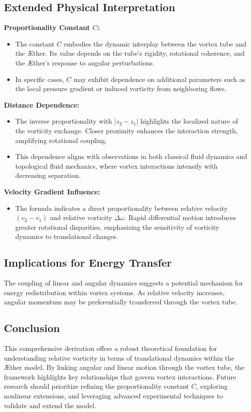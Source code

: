\documentclass[a4paper,10pt]{article}
\begin{document}
    \subsection*{Extended Physical Interpretation}
    \textbf{Proportionality Constant $C$:}
    \begin{itemize}
        \item The constant $C$ embodies the dynamic interplay between the vortex tube and the Æther. Its value depends on the tube's rigidity, rotational coherence, and the Æther's response to angular perturbations.
        \item In specific cases, $C$ may exhibit dependence on additional parameters such as the local pressure gradient or induced vorticity from neighboring flows.
    \end{itemize}

    \textbf{Distance Dependence:}
    \begin{itemize}
        \item The inverse proportionality with $|z_2 - z_1|$ highlights the localized nature of the vorticity exchange. Closer proximity enhances the interaction strength, amplifying rotational coupling.
        \item This dependence aligns with observations in both classical fluid dynamics and topological fluid mechanics, where vortex interactions intensify with decreasing separation.
    \end{itemize}

    \textbf{Velocity Gradient Influence:}
    \begin{itemize}
        \item The formula indicates a direct proportionality between relative velocity $(v_2 - v_1)$ and relative vorticity $\Delta \omega$. Rapid differential motion introduces greater rotational disparities, emphasizing the sensitivity of vorticity dynamics to translational changes.
    \end{itemize}

    \subsection*{Implications for Energy Transfer}
    The coupling of linear and angular dynamics suggests a potential mechanism for energy redistribution within vortex systems. As relative velocity increases, angular momentum may be preferentially transferred through the vortex tube.

    \subsection*{Conclusion}
    This comprehensive derivation offers a robust theoretical foundation for understanding relative vorticity in terms of translational dynamics within the Æther model. By linking angular and linear motion through the vortex tube, the framework highlights key relationships that govern vortex interactions. Future research should prioritize refining the proportionality constant $C$, exploring nonlinear extensions, and leveraging advanced experimental techniques to validate and extend the model.
\end{document}
